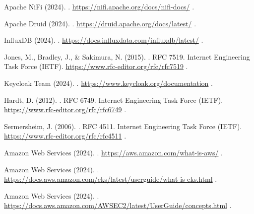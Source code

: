 \begin{thebibliography}{99}
    Apache NiFi (2024).
    .
    \newblock \url{https://nifi.apache.org/docs/nifi-docs/}
    \newblock [Accessed: 01/04/2025].

    Apache Druid (2024).
    .
    \newblock \url{https://druid.apache.org/docs/latest/}
    \newblock [Accessed: 01/04/2025].

    InfluxDB (2024).
    .
    \newblock \url{https://docs.influxdata.com/influxdb/latest/}
    \newblock [Accessed: 01/04/2025].

    Jones, M., Bradley, J., \& Sakimura, N. (2015).
    .
    \newblock RFC 7519. Internet Engineering Task Force (IETF).
    \newblock \url{https://www.rfc-editor.org/rfc/rfc7519}
    \newblock [Accessed: 18/06/2024].

    Keycloak Team (2024).
    .
    \newblock \url{https://www.keycloak.org/documentation}
    \newblock [Accessed: 18/06/2024].

    Hardt, D. (2012).
    .
    \newblock RFC 6749. Internet Engineering Task Force (IETF).
    \newblock \url{https://www.rfc-editor.org/rfc/rfc6749}
    \newblock [Accessed: 18/06/2024].

    Sermersheim, J. (2006).
    .
    \newblock RFC 4511. Internet Engineering Task Force (IETF).
    \newblock \url{https://www.rfc-editor.org/rfc/rfc4511}
    \newblock [Accessed: 18/06/2024].

    Amazon Web Services (2024).
    .
    \newblock \url{https://aws.amazon.com/what-is-aws/}
    \newblock [Accessed: 18/06/2024].

    Amazon Web Services (2024).
    .
    \newblock \url{https://docs.aws.amazon.com/eks/latest/userguide/what-is-eks.html}
    \newblock [Accessed: 18/06/2024].

    Amazon Web Services (2024).
    .
    \newblock \url{https://docs.aws.amazon.com/AWSEC2/latest/UserGuide/concepts.html}
    \newblock [Accessed: 18/06/2024].


\end{thebibliography}
